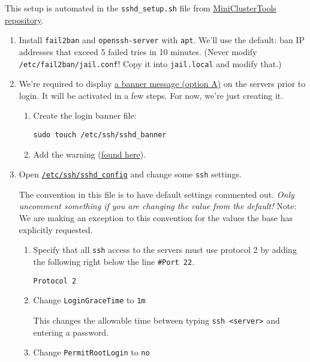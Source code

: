 This setup is automated in the \texttt{sshd\_setup.sh} file from \href{https://github.com/coyleej/MiniClusterTools}{MiniClusterTools repository}. 

\begin{enumerate}
\item Install \texttt{fail2ban} and \texttt{openssh-server} with \texttt{apt}. We'll use the default: ban IP addresses that exceed 5 failed tries in 10 minutes. (Never modify \texttt{/etc/fail2ban/jail.conf}! Copy it into \texttt{jail.local} and modify that.)

\item We're required to display \href{https://www.stigviewer.com/stig/firewall/2015-09-18/finding/V-3013}{a banner message (option A)} on the servers prior to login. It will be activated in a few steps. For now, we're just creating it.

	\begin{enumerate}
		\item Create the login banner file: 

			\texttt{sudo touch /etc/ssh/sshd\_banner}

		\item Add the warning (\href{https://www.stigviewer.com/stig/firewall/2015-09-18/finding/V-3013}{found here}). 
	\end{enumerate}

\item Open \href{https://linux.die.net/man/5/sshd_config}{\texttt{/etc/ssh/sshd\_config}} and change some \texttt{ssh} settings.

	The convention in this file is to have default settings commented out. \emph{Only uncomment something if you are changing the value from the default!} Note: We are making an exception to this convention for the values the base has explicitly requested.

	\begin{enumerate}
	\item Specify that all \texttt{ssh} access to the servers must use protocol 2 by adding the following right below the line \texttt{\#Port 22}.

		\texttt{Protocol 2}

	\item Change \texttt{LoginGraceTime} to \texttt{1m}

	This changes the allowable time between typing \texttt{ssh <server>} and entering a password.

	\item Change \texttt{PermitRootLogin} to \texttt{no}


\end{enumerate}
\end{enumerate}
